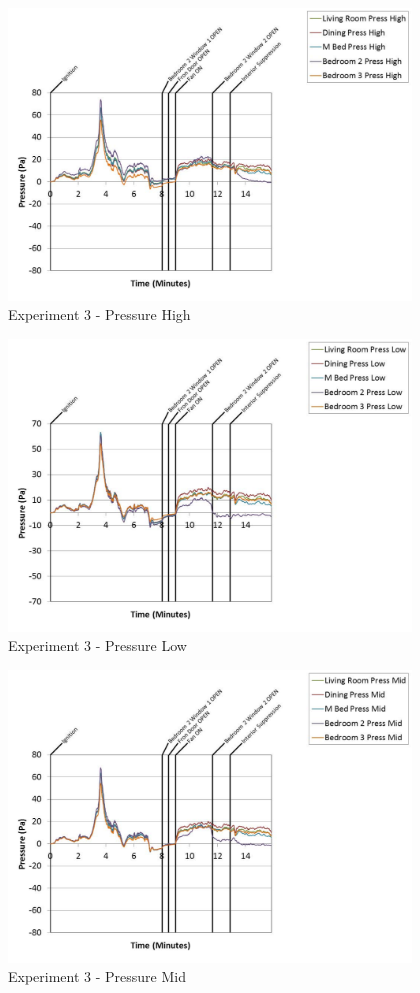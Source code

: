 \documentclass{article}
\begin{document}
\begin{appendices}
	\clearpage

	\begin{figure}[h!]
		\centering
		\includegraphics[height=3.05in]{0_Images/Results_Charts/Exp_3_Charts/PressureHigh.pdf}
		\caption{Experiment 3 - Pressure High}
	\end{figure}
 

	\begin{figure}[h!]
		\centering
		\includegraphics[height=3.05in]{0_Images/Results_Charts/Exp_3_Charts/PressureLow.pdf}
		\caption{Experiment 3 - Pressure Low}
	\end{figure}
 
	\clearpage

	\begin{figure}[h!]
		\centering
		\includegraphics[height=3.05in]{0_Images/Results_Charts/Exp_3_Charts/PressureMid.pdf}
		\caption{Experiment 3 - Pressure Mid}
	\end{figure}
 


\end{appendices}
\end{document}
